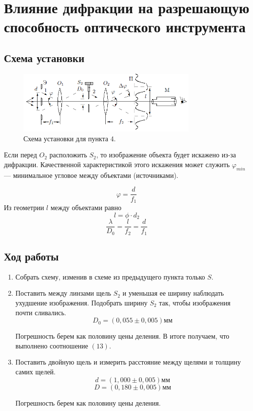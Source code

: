 \documentclass[a4paper, 12pt]{article}%
\begin{document}
\section{Влияние дифракции на разрешающую способность оптического инструмента}
\subsection*{Схема установки}

\begin{figure}[h]
\begin{center}
\includegraphics[width = 0.8\textwidth]{5.png}
\caption{Схема установки для пункта 4.}
\end{center}
\end{figure}

Если перед $O_2$ расположить $S_2$, то изображение объекта будет искажено из-за дифракции. Качественной характеристикой этого искажения может служить $\varphi_{min}$ --- минимальное угловое между объектами (источниками). 

\begin{equation}
\varphi = \frac{d}{f_1}
\end{equation}
Из геометрии $l$ между объектами равно 
\begin{equation}
l = \phi \cdot d_2
\end{equation}
\begin{equation}
\dfrac{\lambda}{D_0} = \dfrac{l}{f_2} = \dfrac{d}{f_1}
\end{equation}
\subsection*{Ход работы}
\begin{enumerate}
\item Собрать схему, изменив в схеме из предыдущего пункта только $S$.
\item Поставить между линзами щель $S_2$ и уменьшая ее ширину наблюдать ухудшение изображения. Подобрать ширину $S_2$ так, чтобы изображения почти сливались.
\[D_0 = (0,055 \pm 0,005)\text{мм}\]


Погрешность берем как половину цены деления.
В итоге получаем, что выполнено соотношение $(13)$.
\item Поставить двойную щель и измерить расстояние между щелями и толщину самих щелей. 
\[d = (1,000 \pm 0,005) \text{мм}\]
\[D = (0,180 \pm 0,005) \text{мм}\]

Погрешность берем как половину цены деления.
\end{enumerate}
\end{document}
